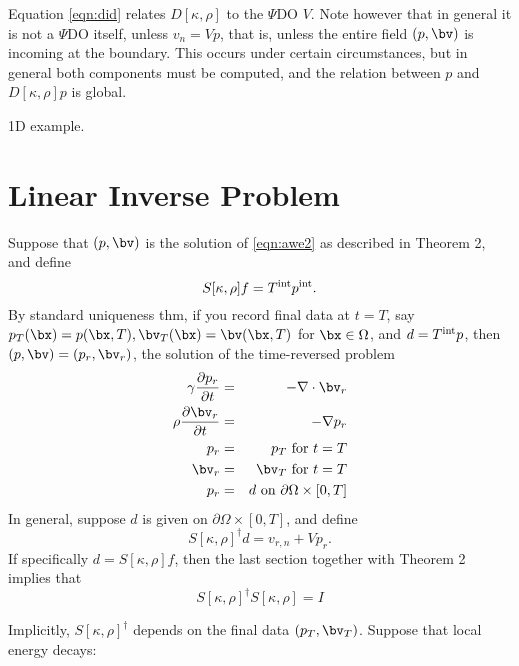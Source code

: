 Equation \ref{eqn:did} relates $D[\kappa,\rho]$ to the $\Psi$DO
$V$. Note however that in general it is not a $\Psi$DO itself, unless
$v_n=Vp$, that is, unless the entire field $(p,\bv)$ is incoming at
the boundary. This occurs under certain circumstances, but in general
both components must be computed, and the relation between $p$ and
$D[\kappa,\rho]p$ is global.

1D example. 
 
\section{Linear Inverse Problem}

Suppose that $(p,\bv)$ is the solution of \ref{eqn:awe2} as described
in Theorem 2, and define 
\[
S[\kappa,\rho] f = T^{\rm int}p^{\rm int}.
\]
By standard uniqueness thm, if you record final data at
$t=T$, say $p_T(\bx)=p(\bx,T), \bv_T(\bx)=\bv(\bx,T)$ for $\bx \in
\Omega$, and $d = T^{\rm int}p$, then $(p,\bv)=(p_r,\bv_r)$, the
solution of the time-reversed problem
\begin{eqnarray}
\label{eqn:awer}
\gamma \frac{\partial p_r}{\partial t} & = & - \nabla \cdot \bv_r \nonumber \\
\rho \frac{\partial \bv_r}{\partial t} & = & - \nabla p_r \nonumber \\
p_r & =& p_T \mbox{ for } t= T\nonumber\\ 
\bv_r & = & \bv_T \mbox{ for } t= T \\
p_r & = & d \mbox{ on } \partial \Omega \times [0,T]
\end{eqnarray}
In general, suppose $d$ is given on $\partial \Omega \times [0,T]$,
and define
\[
S[\kappa,\rho]^{\dagger}d = v_{r,n} + Vp_r.
\]
If specifically $d = S[\kappa,\rho]f$, then the last section together
with Theorem 2 implies that
\begin{equation}
\label{eqn:idealinv}
S[\kappa,\rho]^{\dagger}S[\kappa,\rho] = I
\end{equation}

Implicitly, $S[\kappa,\rho]^{\dagger}$ depends on the final data
$(p_T,\bv_T)$. Suppose that local energy decays: 

